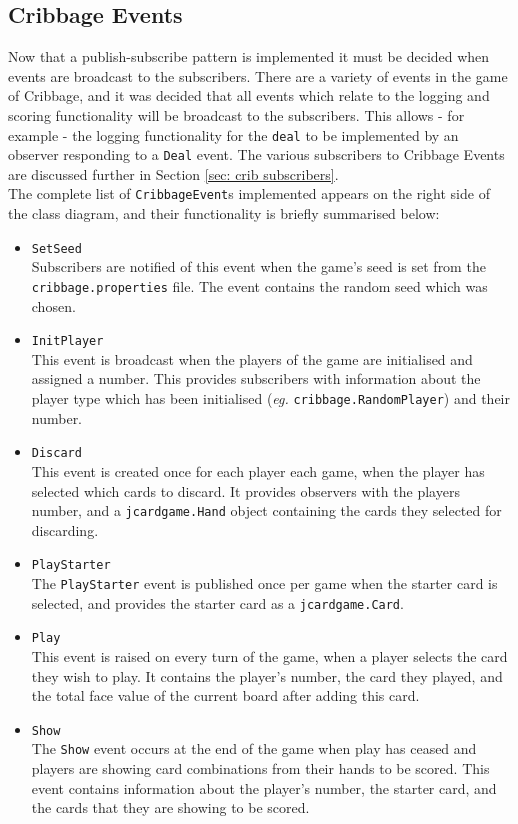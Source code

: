 \documentclass{article}
\begin{document}
\subsection{Cribbage Events}
\label{sec: crib events}
Now that a publish-subscribe pattern is implemented it must be decided when events are broadcast to the subscribers. There are a variety of events in the game of Cribbage, and it was decided that all events which relate to the logging and scoring functionality will be broadcast to the subscribers. This allows - for example - the logging functionality for the \verb|deal| to be implemented by an observer responding to a \verb|Deal| event. The various subscribers to Cribbage Events are discussed further in Section \ref{sec: crib subscribers}.\\[2mm]
The complete list of \verb|CribbageEvent|s implemented appears on the right side of the class diagram, and their functionality is briefly summarised below:
\begin{multicols}{2}
    \begin{itemize}
        \item \verb|SetSeed|\\[2mm]
        Subscribers are notified of this event when the game's seed is set from the \verb|cribbage.properties| file. The event contains the random seed which was chosen.
        \item \verb|InitPlayer|\\[2mm]
        This event is broadcast when the players of the game are initialised and assigned a number. This provides subscribers with information about the player type which has been initialised (\textit{eg.} \verb|cribbage.RandomPlayer|) and their number.
        \item \verb|Discard|\\[2mm]
        This event is created once for each player each game, when the player has selected which cards to discard. It provides observers with the players number, and a \verb|jcardgame.Hand| object containing the cards they selected for discarding.
        \item \verb|PlayStarter|\\[2mm]
        The \verb|PlayStarter| event is published once per game when the starter card is selected, and provides the starter card as a \verb|jcardgame.Card|.
        \item \verb|Play|\\[2mm]
        This event is raised on every turn of the game, when a player selects the card they wish to play. It contains the player's number, the card they played, and the total face value of the current board after adding this card.
        \item \verb|Show|\\[2mm]
        The \verb|Show| event occurs at the end of the game when play has ceased and players are showing card combinations from their hands to be scored. This event contains information about the player's number, the starter card, and the cards that they are showing to be scored.
    \end{itemize}
\end{multicols}
\end{document}
